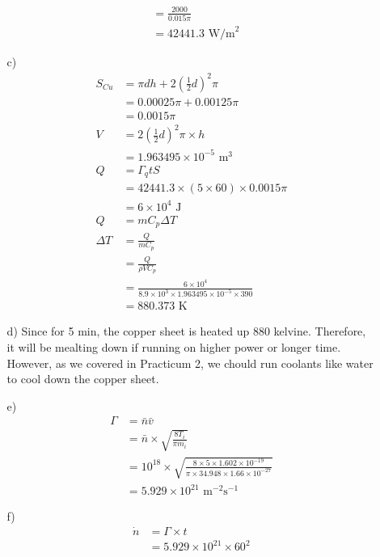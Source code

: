 \documentclass{article}
\begin{document}
\begin{itemize}
\begin{itemize}
\begin{align*}
            &=\frac{2000}{0.015\pi}\\
            &=42441.3 \text{ W/m}^2
        \end{align*}
        \item [c)]
        \begin{align*}
            S_{Cu}&=\pi d h + 2(\frac{1}{2}d)^2\pi\\
            &=0.00025\pi+0.00125\pi\\
            &=0.0015\pi\\
            V &= 2(\frac{1}{2}d)^2\pi \times h\\
            &=1.963495\times 10^{-5} \text{ m}^3\\
            Q &= \Gamma_q t S\\
            &=42441.3\times (5\times 60)\times 0.0015\pi\\
            &=6\times 10^4 \text{ J}\\
            Q&=mC_p\Delta T\\
            \Delta T &= \frac{Q}{mC_p}\\
            &=\frac{Q}{\rho V C_p}\\
            &=\frac{6\times 10^4}{8.9\times 10^3\times 1.963495\times 10^{-5}\times 390}\\
            &=880.373 \text{ K}
        \end{align*}
        \item [d)]
        Since for 5 min, the copper sheet is heated up 880 kelvine. Therefore, it will be mealting down if running on higher power or longer  time. However, as we covered in Practicum 2, we chould run coolants like water to cool down the copper sheet.
        \item [e)]
        \begin{align*}
            \Gamma &=\bar{n}\bar{v}\\
            &=\bar{n}\times \sqrt{\frac{8T_i}{\pi m_i}}\\
            &=10^{18}\times \sqrt{\frac{8\times 5\times 1.602\times 10^{-19}}{\pi\times  34.948 \times 1.66\times 10^{-27}}}\\
            &=5.929\times 10^{21} \text{ m}^{-2}\text{s}^{-1}
        \end{align*}
        \item [f)]
        \begin{align*}
            \dot{n}&=\Gamma \times t\\
            &=5.929\times 10^{21}\times 60^2\\

\end{align*}
\end{itemize}
\end{itemize}
\end{document}

